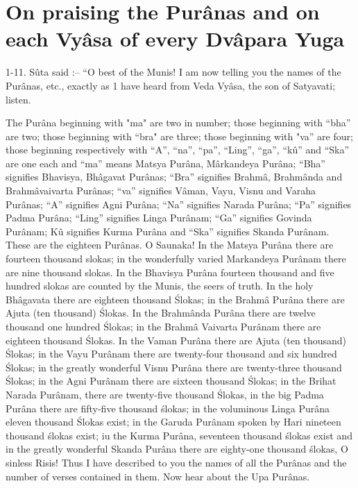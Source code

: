 \chapter{On praising the Pur\^anas and on each Vy\^asa of every Dv\^apara Yuga}

1-11. S\^uta said :-- ``O best of the Munis! I am now telling you the names of the Pur\^anas, etc., exactly as 1 have heard from Veda Vy\^asa, the son of Satyavati; listen.

The Pur\^ana beginning with "ma" are two in number; those beginning with ``bha'' are two; those beginning with ``bra" are three; those beginning with "va'' are four; those beginning respectively with ``A'', ``na'', ``pa'', ``Ling'', ``ga'', ``k\^u'' and ``Ska'' are one each and ``ma'' means Matsya Pur\^ana, M\^arkandeya Pur\^ana; ``Bha'' signifies Bhavisya, Bh\^agavat Pur\^anas; ``Bra'' signifies Brahm\^a, Brahm\^anda and Brahm\^avaivarta Pur\^anas; ``va'' signifies V\^aman, Vayu, Visnu and Varaha Pur\^anas; ``A'' signifies Agni Pur\^ana; ``Na'' signifies Narada Pur\^ana; ``Pa'' signifies Padma Pur\^ana; ``Ling'' signifies Linga Pur\^anam; ``Ga'' signifies Govinda Pur\^anam; K\^u signifies Kurma Pur\^ana and ``Ska'' signifies Skanda Pur\^anam. These are the eighteen Pur\^anas. O Saunaka! In the Matsya Pur\^ana there are fourteen thousand slokas; in the wonderfully varied Markandeya Pur\^anam there are nine thousand slokas. In the Bhavisya Pur\^ana fourteen thousand and five hundred slokas are counted by the Munis, the seers of truth. In the holy Bh\^agavata there are eighteen thousand \'Slokas; in the Brahm\^a Pur\^ana there are Ajuta (ten thousand) \'Slokas. In the Brahm\^anda Pur\^ana there are twelve thousand one hundred \'Slokas; in the Brahm\^a Vaivarta Pur\^anam there are eighteen thousand \'Slokas. In the Vaman Pur\^ana there are Ajuta (ten thousand) \'Slokas; in the Vayu Pur\^anam there are twenty-four thousand and six hundred \'Slokas; in the greatly wonderful Visnu Pur\^ana there are twenty-three thousand \'Slokas; in the Agni Pur\^anam there are sixteen thousand \'Slokas; in the Brihat Narada Pur\^anam, there are twenty-five thousand \'Slokas, in the big Padma Pur\^ana there are fifty-five thousand \'slokas; in the voluminous Linga Pur\^ana eleven thousand \'Slokas exist; in the Garuda Pur\^anam spoken by Hari nineteen thousand \'slokas exist; iu the Kurma Pur\^ana, seventeen thousand \'slokas exist and in the greatly wonderful Skanda Pur\^ana there are eighty-one thousand \'slokas, O sinless Risis! Thus I have described to you the names of all the Pur\^anas and the number of verses contained in them. Now hear about the Upa Pur\^anas.

